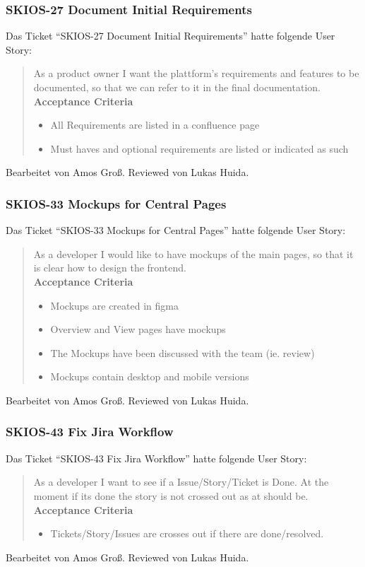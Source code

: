 \subsubsection{SKIOS-27 Document Initial Requirements}
Das Ticket \enquote{SKIOS-27 Document Initial Requirements} hatte folgende User Story:
\begin{quotation}
    As a product owner I want the plattform's requirements and features to be documented, so that we can refer to it in the final documentation. \\
\textbf{Acceptance Criteria}
\begin{itemize}
    \item All Requirements are listed in a confluence page
    \item Must haves and optional requirements are listed or indicated as such
\end{itemize}
\end{quotation}
Bearbeitet von Amos Groß.
Reviewed von Lukas Huida.

\subsubsection{SKIOS-33 Mockups for Central Pages}
Das Ticket \enquote{SKIOS-33 Mockups for Central Pages} hatte folgende User Story:
\begin{quotation}
    As a developer I would like to have mockups of the main pages, so that it is clear how to design the frontend. \\
\textbf{Acceptance Criteria}
\begin{itemize}
    \item Mockups are created in figma
    \item Overview and View pages have mockups
    \item The Mockups have been discussed with the team (ie. review)
    \item Mockups contain desktop and mobile versions
\end{itemize}
\end{quotation}
Bearbeitet von Amos Groß.
Reviewed von Lukas Huida.

\subsubsection{SKIOS-43 Fix Jira Workflow}
Das Ticket \enquote{SKIOS-43 Fix Jira Workflow} hatte folgende User Story:
\begin{quotation}
    As a developer I want to see if a Issue/Story/Ticket is Done. At the moment if its done the story is not crossed out as at should be. \\ 
\textbf{Acceptance Criteria}
\begin{itemize}
    \item Tickets/Story/Issues are crosses out if there are done/resolved.
\end{itemize}
\end{quotation}
Bearbeitet von Amos Groß.
Reviewed von Lukas Huida.

